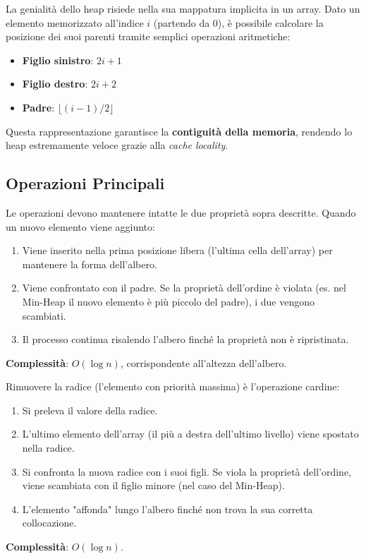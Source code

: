 \medskip

La genialità dello heap risiede nella sua mappatura implicita in un array. Dato un elemento memorizzato all'indice $i$ (partendo da 0), è possibile calcolare la posizione dei suoi parenti tramite semplici operazioni aritmetiche:

\begin{itemize}
    \item \textbf{Figlio sinistro}: $2i + 1$
    \item \textbf{Figlio destro}: $2i + 2$
    \item \textbf{Padre}: $\lfloor (i - 1) / 2 \rfloor$
\end{itemize}

\medskip

Questa rappresentazione garantisce la \textbf{contiguità della memoria}, rendendo lo heap estremamente veloce grazie alla \textit{cache locality}.

\subsection*{Operazioni Principali}

Le operazioni devono mantenere intatte le due proprietà sopra descritte. Quando un nuovo elemento viene aggiunto:
\begin{enumerate}
    \item Viene inserito nella prima posizione libera (l'ultima cella dell'array) per mantenere la forma dell'albero.
    \item Viene confrontato con il padre. Se la proprietà dell'ordine è violata (es. nel Min-Heap il nuovo elemento è più piccolo del padre), i due vengono scambiati.
    \item Il processo continua risalendo l'albero finché la proprietà non è ripristinata.
\end{enumerate}
\textbf{Complessità}: $O(\log n)$, corrispondente all'altezza dell'albero.

\medskip

Rimuovere la radice (l'elemento con priorità massima) è l'operazione cardine:
\begin{enumerate}
    \item Si preleva il valore della radice.
    \item L'ultimo elemento dell'array (il più a destra dell'ultimo livello) viene spostato nella radice.
    \item Si confronta la nuova radice con i suoi figli. Se viola la proprietà dell'ordine, viene scambiata con il figlio minore (nel caso del Min-Heap).
    \item L'elemento "affonda" lungo l'albero finché non trova la sua corretta collocazione.
\end{enumerate}
\textbf{Complessità}: $O(\log n)$.

